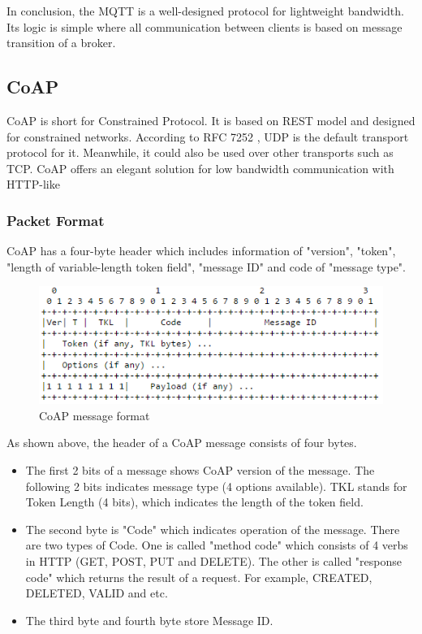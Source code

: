 \documentclass{Nan_Thesis}
\begin{document}
In conclusion, the MQTT is a well-designed protocol for lightweight bandwidth. Its logic is simple where all communication between clients is based on message transition of a broker.
\subsection{CoAP}
CoAP is short for Constrained Protocol. It is based on REST model and designed for constrained networks. According to RFC 7252 \cite{shelby2014constrained}, UDP is the default transport protocol for it. Meanwhile, it could also be used over other transports such as TCP. CoAP offers an elegant solution for low bandwidth communication with HTTP-like 

\subsubsection{Packet Format}
CoAP has a four-byte header which includes information of "version", "token", "length of variable-length token field", "message ID" and code of "message type".

\begin{figure}[h]
  \centering 
      \includegraphics[scale=1]{pic/coapformat.png} 
  \caption{CoAP message format \cite{shelby2014constrained}}
\end{figure}

As shown above, the header of a CoAP message consists of four bytes. 

\begin{itemize}
  \item The first 2 bits of a message shows CoAP version of the message. The following 2 bits indicates message type (4 options available). TKL stands for Token Length (4 bits), which indicates the length of the token field. 
  \item The second byte is "Code" which indicates operation of the message. There are two types of Code. One is called "method code" which consists of 4 verbs in HTTP (GET, POST, PUT and DELETE). The other is called "response code" which returns the result of a request. For example, CREATED, DELETED, VALID and etc. 
  \item The third byte and fourth byte store Message ID.
\end{itemize}
\end{document}
